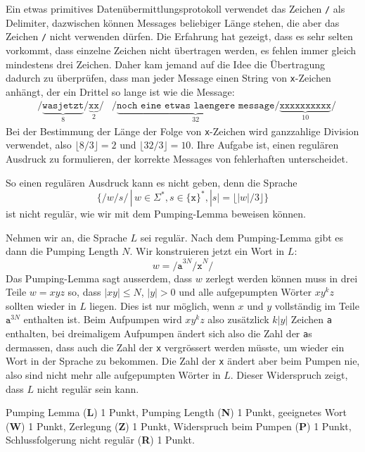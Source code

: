 Ein etwas primitives Datenübermittlungsprotokoll verwendet
das Zeichen \texttt{/} als Delimiter, dazwischen können Messages beliebiger
Länge stehen, die aber das Zeichen \texttt{/} nicht verwenden dürfen.
Die Erfahrung hat gezeigt, dass es sehr selten vorkommt, dass einzelne
Zeichen nicht übertragen werden, es fehlen immer gleich mindestens drei
Zeichen. Daher kam jemand auf die Idee die Übertragung dadurch zu überprüfen,
dass man jeder Message einen String von \texttt{x}-Zeichen anhängt, der
ein Drittel so lange ist wie die Message:
\begin{align*}
&\texttt{/}\underbrace{\texttt{wasjetzt}}_8\texttt{/}\underbrace{\texttt{xx}}_2\texttt{/}
&\texttt{/}\underbrace{\texttt{noch eine etwas laengere message}}_{32}\texttt{/}\underbrace{\texttt{xxxxxxxxxx}}_{10}\texttt{/}
\end{align*}
Bei der Bestimmung der Länge der Folge von \texttt{x}-Zeichen wird ganzzahlige
Division verwendet, also $\lfloor 8 / 3\rfloor = 2$ und $\lfloor 32 / 3 \rfloor = 10$.
Ihre Aufgabe ist, einen regulären Ausdruck zu formulieren, der korrekte
Messages von fehlerhaften unterscheidet.


\begin{loesung}
So einen regulären Ausdruck kann es nicht geben, denn die Sprache 
\[
\{ \texttt{/}w\texttt{/}s\texttt{/}\, |\, w\in \Sigma^*, s\in\{\texttt{x}\}^*,
|s| = \lfloor |w|/3\rfloor
\}
\]
ist nicht regulär, wie wir mit dem Pumping-Lemma beweisen können.

Nehmen wir an, die Sprache $L$ sei regulär. Nach dem Pumping-Lemma gibt
es dann die Pumping Length $N$. Wir konstruieren jetzt ein Wort in $L$:
\[
w=
\texttt{/a}^{3N}\texttt{/x}^N\texttt{/}
\]
Das Pumping-Lemma sagt ausserdem, dass $w$ zerlegt werden können muss in
drei Teile $w=xyz$ so, dass $|xy|\le N$, $|y|>0$ und alle aufgepumpten
Wörter $xy^kz$ sollten wieder in $L$ liegen. Dies ist nur möglich,
wenn $x$ und $y$ vollständig im Teile $\texttt{a}^{3N}$ enthalten ist.
Beim Aufpumpen wird $xy^kz$ also zusätzlick $k|y|$ Zeichen \texttt{a}
enthalten, bei dreimaligem Aufpumpen ändert sich also die Zahl der 
\texttt{a}s dermassen, dass auch die Zahl der \texttt{x} vergrössert
werden müsste, um wieder ein Wort in der Sprache zu bekommen. Die Zahl
der \texttt{x} ändert aber beim Pumpen nie, also sind nicht mehr alle
aufgepumpten Wörter in $L$. Dieser Widerspruch zeigt, dass $L$ nicht
regulär sein kann.
\end{loesung}

\begin{bewertung}
Pumping Lemma (\textbf{L}) 1 Punkt, Pumping Length (\textbf{N}) 1 Punkt,
geeignetes Wort (\textbf{W}) 1 Punkt, Zerlegung (\textbf{Z}) 1 Punkt,
Widerspruch beim Pumpen (\textbf{P}) 1 Punkt,
Schlussfolgerung nicht regulär (\textbf{R}) 1 Punkt.
\end{bewertung}
